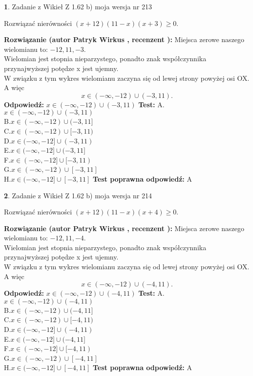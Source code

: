 \documentclass[12pt, a4paper]{article}
\theoremstyle{definition} %
\newtheorem{zad}{}
\newcommand{\zadStart}[1]{\begin{zad}#1\newline}
\newcommand{\zadStop}{\end{zad}}
\newcommand{\rozwStart}[2]{\noindent \textbf{Rozwiązanie (autor #1 , recenzent #2): }\newline}
\newcommand{\rozwStop}{\newline}
\newcommand{\odpStart}{\noindent \textbf{Odpowiedź:}\newline}
\newcommand{\odpStop}{\newline}
\newcommand{\testStart}{\noindent \textbf{Test:}\newline}
\newcommand{\testStop}{\newline}
\newcommand{\kluczStart}{\noindent \textbf{Test poprawna odpowiedź:}\newline}
\newcommand{\kluczStop}{\newline}
\begin{document}
\zadStart{Zadanie z Wikieł Z 1.62 b) moja wersja nr 213}

Rozwiązać nierówności $(x+12)(11-x)(x+3)\ge0$.
\zadStop
\rozwStart{Patryk Wirkus}{}
Miejsca zerowe naszego wielomianu to: $-12, 11, -3$.\\
Wielomian jest stopnia nieparzystego, ponadto znak współczynnika przy\linebreak najwyższej potędze x jest ujemny.\\ W związku z tym wykres wielomianu zaczyna się od lewej strony powyżej osi OX. A więc $$x \in (-\infty,-12) \cup (-3,11).$$
\rozwStop
\odpStart
$x \in (-\infty,-12) \cup (-3,11)$
\odpStop
\testStart
A.$x \in (-\infty,-12) \cup (-3,11)$\\
B.$x \in (-\infty,-12) \cup (-3,11]$\\
C.$x \in (-\infty,-12) \cup [-3,11)$\\
D.$x \in (-\infty,-12] \cup (-3,11)$\\
E.$x \in (-\infty,-12] \cup (-3,11]$\\
F.$x \in (-\infty,-12] \cup [-3,11)$\\
G.$x \in (-\infty,-12) \cup [-3,11]$\\
H.$x \in (-\infty,-12] \cup [-3,11]$
\testStop
\kluczStart
A
\kluczStop



\zadStart{Zadanie z Wikieł Z 1.62 b) moja wersja nr 214}

Rozwiązać nierówności $(x+12)(11-x)(x+4)\ge0$.
\zadStop
\rozwStart{Patryk Wirkus}{}
Miejsca zerowe naszego wielomianu to: $-12, 11, -4$.\\
Wielomian jest stopnia nieparzystego, ponadto znak współczynnika przy\linebreak najwyższej potędze x jest ujemny.\\ W związku z tym wykres wielomianu zaczyna się od lewej strony powyżej osi OX. A więc $$x \in (-\infty,-12) \cup (-4,11).$$
\rozwStop
\odpStart
$x \in (-\infty,-12) \cup (-4,11)$
\odpStop
\testStart
A.$x \in (-\infty,-12) \cup (-4,11)$\\
B.$x \in (-\infty,-12) \cup (-4,11]$\\
C.$x \in (-\infty,-12) \cup [-4,11)$\\
D.$x \in (-\infty,-12] \cup (-4,11)$\\
E.$x \in (-\infty,-12] \cup (-4,11]$\\
F.$x \in (-\infty,-12] \cup [-4,11)$\\
G.$x \in (-\infty,-12) \cup [-4,11]$\\
H.$x \in (-\infty,-12] \cup [-4,11]$
\testStop
\kluczStart
A
\kluczStop
\end{document}

